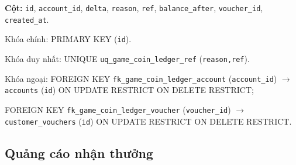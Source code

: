 \begin{description}[leftmargin=3.6cm,labelwidth=3.4cm,style=nextline]
\item[\texttt{game\_coin\_ledger}] \textbf{Cột:} \texttt{id}, \texttt{account\_id}, \texttt{delta}, \texttt{reason}, \texttt{ref}, \texttt{balance\_after}, \texttt{voucher\_id}, \texttt{created\_at}.

Khóa chính: PRIMARY KEY (\texttt{id}).

Khóa duy nhất: UNIQUE \texttt{uq\_game\_coin\_ledger\_ref} (\texttt{reason,ref}).

Khóa ngoại: FOREIGN KEY \texttt{fk\_game\_coin\_ledger\_account} (\texttt{account\_id}) $\rightarrow$ \texttt{accounts} (\texttt{id}) ON UPDATE RESTRICT ON DELETE RESTRICT;\par FOREIGN KEY \texttt{fk\_game\_coin\_ledger\_voucher} (\texttt{voucher\_id}) $\rightarrow$ \texttt{customer\_vouchers} (\texttt{id}) ON UPDATE RESTRICT ON DELETE RESTRICT.

\end{description}

\subsection{Quảng cáo nhận thưởng}

